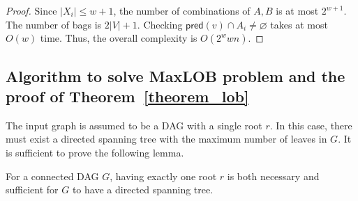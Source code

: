 \documentclass[runningheads]{llncs}
\theoremstyle{plain}
\theoremstyle{definition}
\begin{document}
\begin{proof}
    Since $|X_i| \leq w+1$, the number of combinations of $A, B$ is at most $2^{w+1}$. The number of bags is $2|V|+1$. Checking $\mathsf{pred}(v) \cap A_i \neq \varnothing$ takes at most $O(w)$ time. Thus, the overall complexity is $O(2^w w n)$.
\end{proof}








\subsection{Algorithm to solve MaxLOB problem and the proof of \textbf{Theorem~\ref{theorem_lob}}}\label{appendix_B5}

The input graph is assumed to be a DAG with a single root $r$. In this case, there must exist a directed spanning tree with the maximum number of leaves in $G$. It is sufficient to prove the following lemma.

\begin{lemma}\label{lemma_spanning}
    For a connected DAG $G$, having exactly one root $r$ is both necessary and sufficient for $G$ to have a directed spanning tree.
\end{lemma}
\end{document}
